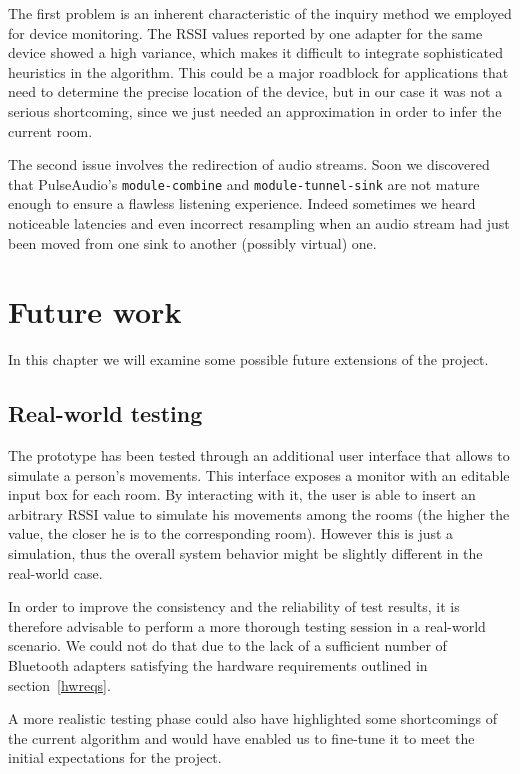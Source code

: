 \documentclass{IEEEtran}
\begin{document}
The first problem is an inherent characteristic of the inquiry method we employed for device monitoring. The RSSI values reported by one adapter for the same device showed a high variance, which makes it difficult to integrate sophisticated heuristics in the algorithm. This could be a major roadblock for applications that need to determine the precise location of the device, but in our case it was not a serious shortcoming, since we just needed an approximation in order to infer the current room.

The second issue involves the redirection of audio streams. Soon we discovered that PulseAudio's \texttt{module-combine} and \texttt{module-tunnel-sink} are not mature enough to ensure a flawless listening experience. Indeed sometimes we heard noticeable latencies and even incorrect resampling when an audio stream had just been moved from one sink to another (possibly virtual) one.


\section{Future work}
In this chapter we will examine some possible future extensions of the project.

\subsection{Real-world testing}
The prototype has been tested through an additional user interface that allows to simulate a person's movements. This interface exposes a monitor with an editable input box for each room. By interacting with it, the user is able to insert an arbitrary RSSI value to simulate his movements among the rooms (the higher the value, the closer he is to the corresponding room). However this is just a simulation, thus the overall system behavior might be slightly different in the real-world case.

In order to improve the consistency and the reliability of test results, it is therefore advisable to perform a more thorough testing session in a real-world scenario. We could not do that due to the lack of a sufficient number of Bluetooth adapters satisfying the hardware requirements outlined in section~\ref{hwreqs}.

A more realistic testing phase could also have highlighted some shortcomings of the current algorithm and would have enabled us to fine-tune it to meet the initial expectations for the project.
\end{document}
